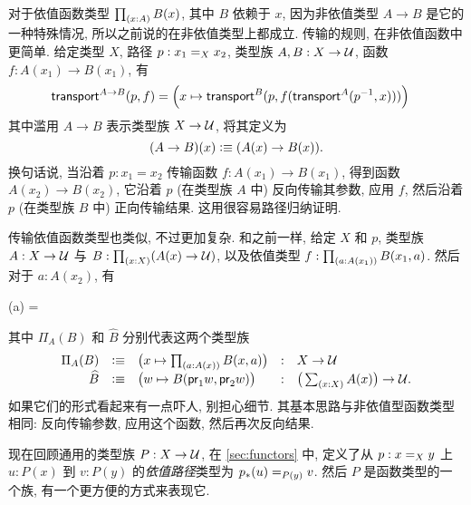对于依值函数类型 $\prd{x:A} B(x)$, 其中 $B$ 依赖于 $x$, 因为非依值类型 $A\to B$ 是它的一种特殊情况, 所以之前说的在非依值类型上都成立.
%
传输的规则, 在非依值函数中更简单.
给定类型 $X$, 路径 $p:\id[X]{x_1}{x_2}$, 类型族 $A,B:X\to \type$, 函数 $f : A(x_1) \to B(x_1)$, 有
\begin{align}
    \label{eq:transport-arrow}
    \transfib{A\to B}{p}{f} &=
    \Big(x \mapsto \transfib{B}{p}{f(\transfib{A}{\opp p}{x})}\Big)
\end{align}
其中滥用 $A\to B$ 表示类型族 $X\to \type$, 将其定义为
\[
    (A\to B)(x) \defeq (A(x)\to B(x)).
\]
换句话说, 当沿着 $p:x_1=x_2$ 传输函数 $f:A(x_1)\to B(x_1)$, 得到函数 $A(x_2)\to B(x_2)$, 它沿着 $p$ (在类型族 $A$ 中) 反向传输其参数, 应用 $f$, 然后沿着 $p$ (在类型族 $B$ 中) 正向传输结果.
这用很容易路径归纳证明.

%
传输依值函数类型也类似, 不过更加复杂.
和之前一样, 给定 $X$ 和 $p$, 类型族 $A:X\to \type$ 与 $B:\prd{x:X} (A(x)\to\type)$, 以及依值类型 $f : \prd{a:A(x_1)} B(x_1,a)$.
然后对于 $a:A(x_2)$, 有
\begin{narrowmultline*}
    (a) = \narrowbreak
\end{narrowmultline*}
其中 $\Pi_A(B)$ 和 $\widehat{B}$ 分别代表这两个类型族
\begin{equation}
    \label{eq:transport-arrow-families}
    \begin{array}{rclcl}
        \Pi_A(B)    & \defeq & \big(x\mapsto \prd{a:A(x)} B(x,a) \big) & : & X\to \type                         \\
        \widehat{B} & \defeq & \big(w \mapsto B(\proj1w,\proj2w) \big) & : & \big(\sm{x:X} A(x)\big) \to \type.
    \end{array}
\end{equation}
如果它们的形式看起来有一点吓人, 别担心细节.
其基本思路与非依值型函数类型相同: 反向传输参数, 应用这个函数, 然后再次反向结果.

现在回顾通用的类型族 $P:X\to\type$, 在 \cref{sec:functors} 中, 定义了从 $p:\id[X]xy$ 上 $u:P(x)$ 到 $v:P(y)$ 的\emph{依值路径}类型为 $\id[P(y)]{\trans{p}{u}}{v}$.
然后 $P$ 是函数类型的一个族, 有一个更方便的方式来表现它.

